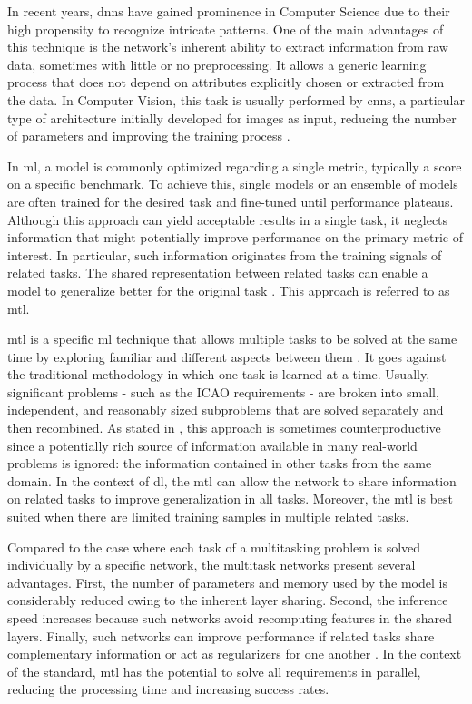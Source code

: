 In recent years, \acfp{dnn} have gained prominence in Computer Science due to their high propensity to recognize intricate patterns. One of the main advantages of this technique is the network's inherent ability to extract information from raw data, sometimes with little or no preprocessing. It allows a generic learning process that does not depend on attributes explicitly chosen or extracted from the data. In Computer Vision, this task is usually performed by \acfp{cnn}, a particular type of architecture initially developed for images as input, reducing the number of parameters and improving the training process \citep{goodfellow2016deep}.
 
In \acf{ml}, a model is commonly optimized regarding a single metric, typically a score on a specific benchmark. To achieve this, single models or an ensemble of models are often trained for the desired task and fine-tuned until performance plateaus. Although this approach can yield acceptable results in a single task, it neglects information that might potentially improve performance on the primary metric of interest. In particular, such information originates from the training signals of related tasks. The shared representation between related tasks can enable a model to generalize better for the original task \citep{ruder2017overview}. This approach is referred to as \acf{mtl}.
 
\acl{mtl} is a specific \acl{ml} technique that allows multiple tasks to be solved at the same time by exploring familiar and different aspects between them \citep{zhang2017survey}. It goes against the traditional methodology in which one task is learned at a time. Usually, significant problems - such as the ICAO requirements - are broken into small, independent, and reasonably sized subproblems that are solved separately and then recombined. As stated in \cite{Caruana1997}, this approach is sometimes counterproductive since a potentially rich source of information available in many real-world problems is ignored: the information contained in other tasks from the same domain. In the context of \acl{dl}, the \acs{mtl} can allow the network to share information on related tasks to improve generalization in all tasks. Moreover, the \acl{mtl} is best suited when there are limited training samples in multiple related tasks.
 
Compared to the case where each task of a multitasking problem is solved individually by a specific network, the multitask networks present several advantages. First, the number of parameters and memory used by the model is considerably reduced owing to the inherent layer sharing. Second, the inference speed increases because such networks avoid recomputing features in the shared layers. Finally, such networks can improve performance if related tasks share complementary information or act as regularizers for one another \citep{vandenhende2021multi}. In the context of the \icao standard, \acs{mtl} has the potential to solve all requirements in parallel, reducing the processing time and increasing success rates.
 
